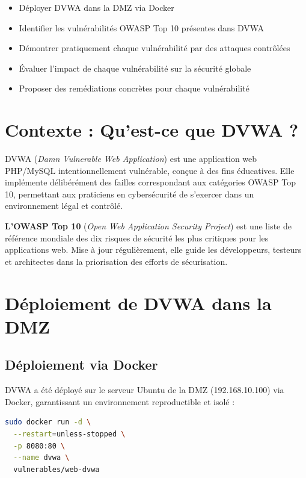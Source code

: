 \documentclass[12pt,a4paper,openany]{report}
\begin{document}
\begin{tcolorbox}[colback=primary!5!white, colframe=primary, title=\textbf{Objectifs de ce Chapitre}]
\begin{itemize}
    \item Déployer DVWA dans la DMZ via Docker
    \item Identifier les vulnérabilités OWASP Top 10 présentes dans DVWA
    \item Démontrer pratiquement chaque vulnérabilité par des attaques contrôlées
    \item Évaluer l'impact de chaque vulnérabilité sur la sécurité globale
    \item Proposer des remédiations concrètes pour chaque vulnérabilité
\end{itemize}
\end{tcolorbox}

\section{Contexte : Qu'est-ce que DVWA ?}

DVWA (\textit{Damn Vulnerable Web Application}) est une application web PHP/MySQL intentionnellement
vulnérable, conçue à des fins éducatives. Elle implémente délibérément des failles correspondant aux
catégories OWASP Top 10, permettant aux praticiens en cybersécurité de s'exercer dans un environnement
légal et contrôlé.

\textbf{L'OWASP Top 10} (\textit{Open Web Application Security Project}) est une liste de référence
mondiale des dix risques de sécurité les plus critiques pour les applications web. Mise à jour
régulièrement, elle guide les développeurs, testeurs et architectes dans la priorisation des efforts
de sécurisation.

\section{Déploiement de DVWA dans la DMZ}

\subsection{Déploiement via Docker}

DVWA a été déployé sur le serveur Ubuntu de la DMZ (192.168.10.100) via Docker, garantissant un
environnement reproductible et isolé :

\begin{lstlisting}[language=bash, caption={Démarrage du conteneur DVWA via Docker}]
sudo docker run -d \
  --restart=unless-stopped \
  -p 8080:80 \
  --name dvwa \
  vulnerables/web-dvwa
\end{lstlisting}
\end{document}
